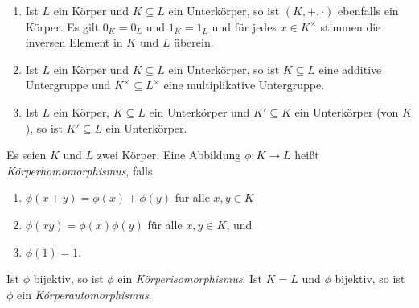 \begin{bem}
 \begin{enumerate}[leftmargin=*]
  \item
   Ist $L$ ein Körper und $K \subseteq L$ ein Unterkörper, so ist $(K,+,\cdot)$ ebenfalls ein Körper. Es gilt $0_K = 0_L$ und $1_K = 1_L$ und für jedes $x \in K^\times$ stimmen die inversen Element in $K$ und $L$ überein.
  \item
   Ist $L$ ein Körper und $K \subseteq L$ ein Unterkörper, so ist $K \subseteq L$ eine additive Untergruppe und $K^\times \subseteq L^\times$ eine multiplikative Untergruppe.
  \item
   Ist $L$ ein Körper, $K \subseteq L$ ein Unterkörper und $K' \subseteq K$ ein Unterkörper (von $K$), so ist $K' \subseteq L$ ein Unterkörper.
 \end{enumerate}
\end{bem}


\begin{defi}
 Es seien $K$ und $L$ zwei Körper. Eine Abbildung $\phi \colon K \to L$ heißt \emph{Körperhomomorphismus}, falls
 \begin{enumerate}[label=\roman*)]
  \item
   $\phi(x+y) = \phi(x)+\phi(y)$ für alle $x,y \in K$
  \item
   $\phi(xy) = \phi(x)\phi(y)$ für alle $x,y \in K$, und
  \item
   $\phi(1) = 1$.
 \end{enumerate}
 Ist $\phi$ bijektiv, so ist $\phi$ ein \emph{Körperisomorphismus}. Ist $K = L$ und $\phi$ bijektiv, so ist $\phi$ ein \emph{Körperautomorphismus}.
\end{defi}


